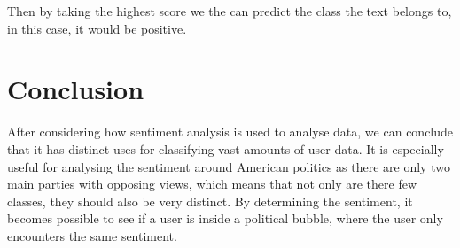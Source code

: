 Then by taking the highest score we the can predict the class the text belongs
to, in this case, it would be positive.

\section{Conclusion}\label{sec:DAConc}
After considering how sentiment analysis is used to analyse data, we can
conclude that it has distinct uses for classifying vast amounts of user data. It
is especially useful for analysing the sentiment around American politics as
there are only two main parties with opposing views, which means that not only
are there few classes, they should also be very distinct. By determining the
sentiment, it becomes possible to see if a user is inside a political bubble,
where the user only encounters the same sentiment.



